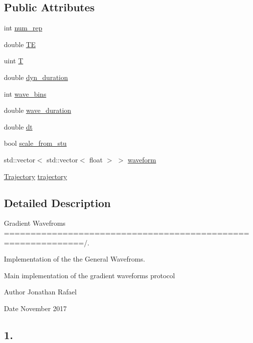 \subsection*{Public Attributes}
\begin{DoxyCompactItemize}
\item 
int \hyperlink{class_gradient_waveform_a25edbe4ee53950831074f2ca4bfca48f}{num\+\_\+rep}
\item 
double \hyperlink{class_gradient_waveform_a4e0c0163e36cc017f5b147e9ca3022e0}{TE}
\item 
uint \hyperlink{class_gradient_waveform_af2f45ff237ba41afe3ff5cedb7c1c966}{T}
\item 
double \hyperlink{class_gradient_waveform_a8608216ab7e5f002dcf6af4f869c5d27}{dyn\+\_\+duration}
\item 
int \hyperlink{class_gradient_waveform_ac2287a6ef99e35f0c1f97fc3ffb37d7b}{wave\+\_\+bins}
\item 
double \hyperlink{class_gradient_waveform_a02d695fa36713bd28d3c85d2bb7a877b}{wave\+\_\+duration}
\item 
double \hyperlink{class_gradient_waveform_a3eacca54a58dc574384f07899a9a6da3}{dt}
\item 
bool \hyperlink{class_gradient_waveform_a712eedb2165b3f889e27244fc9d91ebd}{scale\+\_\+from\+\_\+stu}
\item 
std\+::vector$<$ std\+::vector$<$ float $>$ $>$ \hyperlink{class_gradient_waveform_a565fce08abb28fe26664194c04faeaea}{waveform}
\item 
\hyperlink{class_trajectory}{Trajectory} \hyperlink{class_gradient_waveform_a83a7c844f86acee3b7ab12e7e70202af}{trajectory}
\end{DoxyCompactItemize}


\subsection{Detailed Description}
Gradient Wavefroms =============================================================/. 

Implementation of the the General Wavefroms.

Main implementation of the gradient waveforms protocol \begin{DoxyAuthor}{Author}
Jonathan Rafael 
\end{DoxyAuthor}
\begin{DoxyDate}{Date}
November 2017 \subsection*{1. }
\end{DoxyDate}



